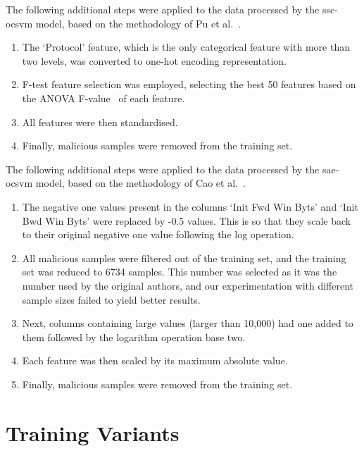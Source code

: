 The following additional steps were applied to the data processed by the
\gls{ssc}-\gls{ocsvm} model, based on the methodology of Pu et al.~\cite{Cao}.
\begin{enumerate}
      \item The `Protocol' feature, which is the only categorical feature with more than
            two levels, was converted to one-hot encoding representation.
      \item F-test feature selection was employed, selecting the best 50 features based on
            the ANOVA F-value~\cite{f_test} of each feature.
      \item All features were then standardised.
      \item Finally, malicious samples were removed from the training set.
\end{enumerate}

The following additional steps were applied to the data processed by the
\gls{sae}-\gls{ocsvm} model, based on the methodology of Cao et al.~\cite{Cao}.
\begin{enumerate}
      \item The negative one values present in the columns `Init Fwd Win Byts' and `Init
            Bwd Win Byts' were replaced by -0.5 values. This is so that they scale back to
            their original negative one value following the log operation.
      \item All malicious samples were filtered out of the training set, and the training
            set was reduced to 6734 samples. This number was selected as it was the number
            used by the original authors, and our experimentation with different sample
            sizes failed to yield better results.
      \item Next, columns containing large values (larger than 10,000) had one added to
            them followed by the logarithm operation base two.
      \item Each feature was then scaled by its maximum absolute value.
      \item Finally, malicious samples were removed from the training set.
\end{enumerate}

\section{Training Variants}%
\label{sec:variants}


